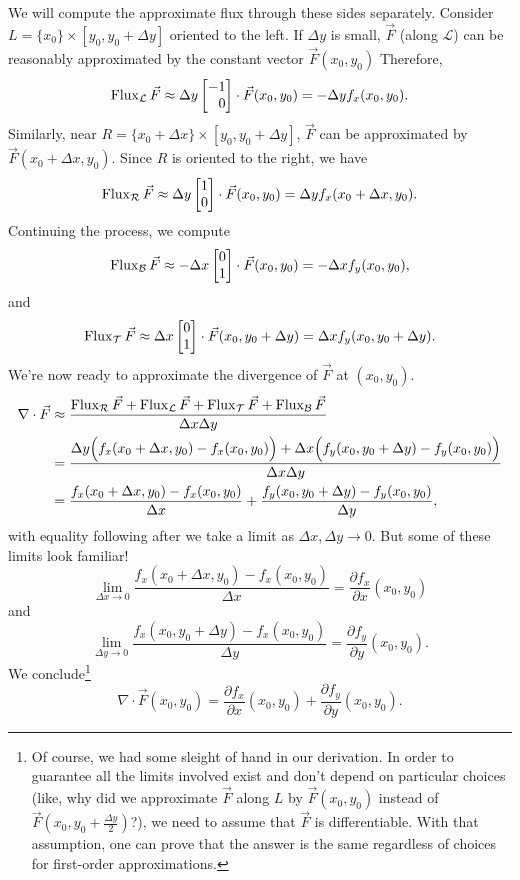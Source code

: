 We will compute the approximate flux through these sides separately.  Consider 
$L=\{x_0\}\times[y_0,y_0+\Delta y]$ oriented to the left.  If $\Delta y$ is small,
$\vec F$ (along $\mathcal L$) can be reasonably approximated by the constant vector
$\vec F(x_0,y_0)$  Therefore,
\[
	\Flux_{\mathcal L}\vec F \approx \Delta y \mat{-1\\0}\cdot \vec F(x_0,y_0) = -\Delta y f_x(x_0,y_0).
\]
Similarly, near $R=\{x_0+\Delta x\}\times [y_0,y_0+\Delta y]$, $\vec F$ can be approximated
by $\vec F(x_0+\Delta x,y_0)$.  Since $R$ is oriented to the right, we have
\[
	\Flux_{\mathcal R}\vec F \approx \Delta y \mat{1\\0}\cdot \vec F(x_0,y_0) = \Delta y f_x(x_0+\Delta x,y_0).
\]
Continuing the process, we compute
\[
	\Flux_{\mathcal B}\vec F \approx -\Delta x\mat{0\\1}\cdot \vec F(x_0,y_0) = -\Delta x f_y(x_0,y_0),
\]
and
\[
	\Flux_{\mathcal T}\vec F \approx \Delta x\mat{0\\1}\cdot \vec F(x_0,y_0+\Delta y) = \Delta x f_y(x_0,y_0+\Delta y).
\]
We're now ready to approximate the divergence of $\vec F$ at $(x_0,y_0)$.
\begin{align*}
	\nabla \cdot \vec F &\approx \frac{\operatorname{Flux}_{\mathcal R}\vec F + \operatorname{Flux}_{\mathcal L}\vec F + \operatorname{Flux}_{\mathcal T}\vec F + \operatorname{Flux}_{\mathcal B}\vec F}{\Delta x\Delta y}\\
		&= \frac{\Delta y\Big( f_x(x_0+\Delta x,y_0) - f_x(x_0,y_0)\Big)
		+\Delta x\Big( f_y(x_0,y_0+\Delta y) - f_y(x_0,y_0)\Big)}{\Delta x\Delta y}\\
		& = \frac{f_x(x_0+\Delta x,y_0) - f_x(x_0,y_0)}{\Delta x} + 
			\frac{f_y(x_0,y_0+\Delta y) - f_y(x_0,y_0)}{\Delta y},
\end{align*}
with equality following after we take a limit as $\Delta x,\Delta y\to 0$.  But some of these
limits look familiar!
\[
	\lim_{\Delta x\to 0} \frac{f_x(x_0+\Delta x,y_0) - f_x(x_0,y_0)}{\Delta x} 
	= \frac{\partial f_x}{\partial x}(x_0,y_0)
\]
and
\[
	\lim_{\Delta y\to 0} \frac{f_x(x_0,y_0+\Delta y) - f_x(x_0,y_0)}{\Delta y}
	= \frac{\partial f_y}{\partial y}(x_0,y_0).
\]
We conclude\footnote{ Of course, we had some sleight of hand in our derivation.  In order
to guarantee  all the limits involved exist and don't depend on particular choices
(like, why did we approximate $\vec F$ along $L$ by $\vec F(x_0,y_0)$ instead of
$\vec F(x_0,y_0+\tfrac{\Delta y}{2})$?), we need to assume that $\vec F$ is differentiable.
With that assumption, one can prove that the answer is the same regardless of choices
for first-order approximations.}
\[
	\nabla \cdot \vec F(x_0,y_0) = \frac{\partial f_x}{\partial x}(x_0,y_0)
	+ \frac{\partial f_y}{\partial y}(x_0,y_0).
\]

